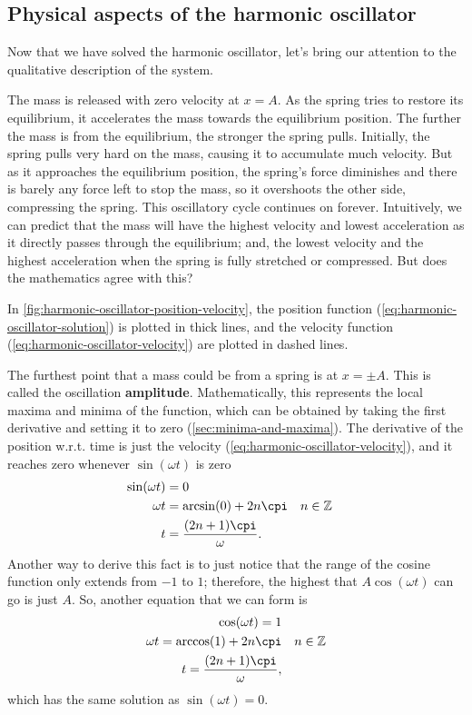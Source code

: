 \subsection{Physical aspects of the harmonic oscillator}

Now that we have solved the harmonic oscillator, let's bring our attention to the qualitative description of the system.

The mass is released with zero velocity at $x = A$. As the spring tries to restore its equilibrium, it accelerates the mass towards the equilibrium position. The further the mass is from the equilibrium, the stronger the spring pulls. Initially, the spring pulls very hard on the mass, causing it to accumulate much velocity. But as it approaches the equilibrium position, the spring's force diminishes and there is barely any force left to stop the mass, so it overshoots the other side, compressing the spring. This oscillatory cycle continues on forever. Intuitively, we can predict that the mass will have the highest velocity and lowest acceleration as it directly passes through the equilibrium; and, the lowest velocity and the highest acceleration when the spring is fully stretched or compressed. But does the mathematics agree with this?

In \cref{fig:harmonic-oscillator-position-velocity}, the position function (\cref{eq:harmonic-oscillator-solution}) is plotted in thick lines, and the velocity function (\cref{eq:harmonic-oscillator-velocity}) are plotted in dashed lines.

The furthest point that a mass could be from a spring is at $x = \pm A$. This is called the oscillation \textbf{amplitude}. Mathematically, this represents the local maxima and minima of the function, which can be obtained by taking the first derivative and setting it to zero (\cref{sec:minima-and-maxima}). The derivative of the position w.r.t. time is just the velocity (\cref{eq:harmonic-oscillator-velocity}), and it reaches zero whenever $\sin(\omega t)$ is zero 
\begin{align}
	\sin(\omega t) & = 0                                                                                              \\
	\omega t       & = \arcsin(0) + 2n\cpi                                                      &  & n \in \mathbb{Z} \\
	t              & = \frac{(2n + 1)\cpi}{\omega}. \label{eq:harmonic-oscillator-max-position}
\end{align}
Another way to derive this fact is to just notice that the range of the cosine function only extends from $-1$ to $1$; therefore, the highest that $A\cos(\omega t)$ can go is just $A$. So, another equation that we can form is
\begin{align}
	\cos(\omega t) = 1                                   \\
	\omega t = \arccos(1) + 2n\cpi &  & n \in \mathbb{Z} \\
	t = \frac{(2n + 1)\cpi}{\omega},
\end{align}
which has the same solution as $\sin(\omega t) = 0$.

